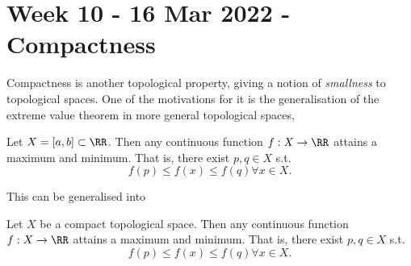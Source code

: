 \section{Week 10 - 16 Mar 2022 - Compactness }
Compactness is another topological property, giving a notion of \emph{smallness}
to topological spaces. One of the motivations for it is the generalisation of
the extreme value theorem in more general topological spaces,
\begin{theorem}
  Let $X=[a,b]\subset\RR$. Then any continuous function $f:X\to\RR$ attains a
  maximum and minimum. That is, there exist $p,q\in X$ s.t. 
  \[f(p)\leq f(x) \leq f(q) \forall x\in X.\]
  \label{thm:evtReals}
\end{theorem}
This can be generalised into
\begin{theorem}
  Let $X$ be a compact topological space. Then any continuous function
  $f:X\to\RR$ attains a maximum and minimum. That is, there exist $p,q\in X$
  s.t. 
  \[f(p)\leq f(x) \leq f(q) \forall x\in X.\]
  \label{thm:evtTopo}
\end{theorem}
